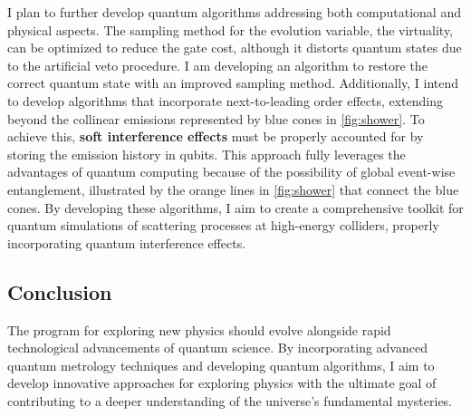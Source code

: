 \documentclass[12pt]{article}
\begin{document}
I plan to further develop quantum algorithms addressing both computational and physical aspects.
The sampling method for the evolution variable, the virtuality, can be optimized to reduce the gate cost, although it distorts quantum states due to the artificial veto procedure.
I am developing an algorithm to restore the correct quantum state with an improved sampling method.
Additionally, I intend to develop algorithms that incorporate next-to-leading order effects, extending beyond the collinear emissions represented by blue cones in \cref{fig:shower}.
To achieve this, \textbf{soft interference effects} must be properly accounted for by storing the emission history in qubits.
This approach fully leverages the advantages of quantum computing because of the possibility of global event-wise entanglement, illustrated by the orange lines in \cref{fig:shower} that connect the blue cones.
By developing these algorithms, I aim to create a comprehensive toolkit for quantum simulations of scattering processes at high-energy colliders, properly incorporating quantum interference effects.

\subsection*{Conclusion}

The program for exploring new physics should evolve alongside rapid technological advancements of quantum science.
By incorporating advanced quantum metrology techniques and developing quantum algorithms, I aim to develop innovative approaches for exploring physics with the ultimate goal of contributing to a deeper understanding of the universe's fundamental mysteries.



\end{document}

